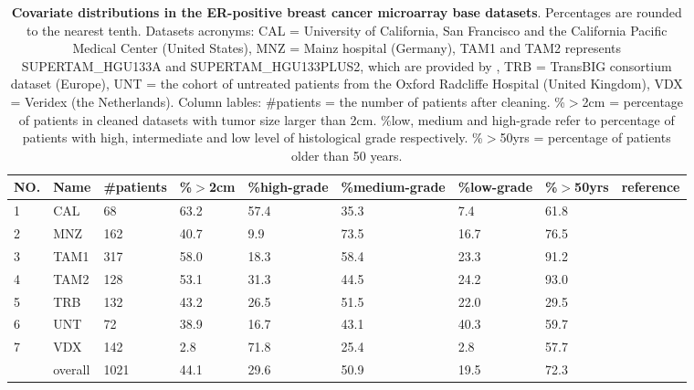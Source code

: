 \documentclass{bioinfo}
\begin{document}
\begin{table}[!t]
    \begin{tabular*}{1\textwidth}{@{\extracolsep{\fill}}lllllllll}
      NO. & Name & \#patients & \%$>$2cm &  \%high-grade & \%medium-grade & \%low-grade & \%$>$50yrs  &reference\\
      \hline
      1 & CAL & 68 & 63.2  & 57.4 & 35.3 & 7.4 & 61.8 & \citet{chin2006genomic} \\ %
       \hline
      2 & MNZ & 162 & 40.7  & 9.9 & 73.5 & 16.7 & 76.5 & \citet{schmidt2008humoral} \\ %
      \hline
      3 & TAM1 & 317 & 58.0  & 18.3 & 58.4 & 23.3 & 91.2 & \citet{foekens2006multicenter}\\%
       \hline
      4 & TAM2 & 128 & 53.1  & 31.3 & 44.5 & 24.2 & 93.0 & \citet{symmans2010genomic}\\%
       \hline
      5 & TRB  & 132 & 43.2  & 26.5 & 51.5 & 22.0 & 29.5 & \citet{desmedt2007strong} \\%
       \hline
      6 & UNT  & 72 & 38.9  & 16.7& 43.1 & 40.3 & 59.7 & \citet{sotiriou2006gene} \\%
       \hline
      7 & VDX  & 142 & 2.8 & 71.8 & 25.4 & 2.8 & 57.7 & \citet{minn2007lung} \\%
       \hline
      \quad & overall & 1021 & 44.1 & 29.6 & 50.9 & 19.5 & 72.3 &  \quad \\
      \hline
    \end{tabular*}
    \caption{\textbf{Covariate distributions in the ER-positive breast
        cancer microarray base datasets}. 
      Percentages are rounded to the nearest tenth. Datasets
      acronyms: CAL = University of California,
      San Francisco and the California Pacific Medical Center (United
      States), MNZ = Mainz hospital (Germany), TAM1 and TAM2 represents
      SUPERTAM\_HGU133A and SUPERTAM\_HGU133PLUS2, which are provided by \citet{Haibe-Kains2012}, 
      TRB = TransBIG consortium dataset (Europe), UNT = the cohort of
      untreated patients from the Oxford Radcliffe Hospital (United
      Kingdom), VDX = Veridex (the Netherlands). Column lables:
      \#patients = the number of patients after cleaning. \%$>$2cm =
      percentage of patients in cleaned datasets with tumor size
      larger than 2cm. \%low, medium and high-grade refer to percentage
      of patients with high, intermediate and low level of histological grade
      respectively. \%$>$50yrs = percentage of patients older than 50 years.}
    \label{table-datasets}
  \end{table}
  
\end{document}
